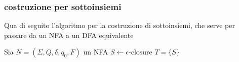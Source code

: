 \subsubsection{costruzione per sottoinsiemi}
Qua di seguito l’algoritmo per la costruzione di sottoinsiemi, che serve per passare da un NFA a un DFA equivalente










\begin{algorithm}
    Sia $N=(\Sigma, Q,\delta,q_0,F)$ un NFA\;
    $S\gets\epsilon\text{-closure}$
    $T=\{S\}$
\end{algorithm}







